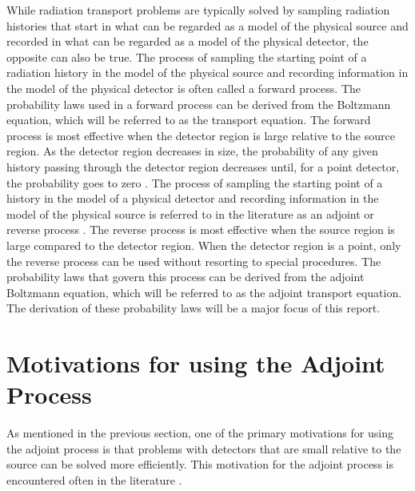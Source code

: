 While radiation transport problems are typically solved by sampling radiation
histories that start in what can be regarded as a model of the physical source
and recorded in what can be regarded as a model of the physical detector, the
opposite can also be true. The process of sampling the starting point of a 
radiation history in the model of the physical source and recording information
in the model of the physical detector is often called a forward process. The 
probability laws used in a forward process can be derived from the Boltzmann 
equation, which will be referred to as the transport equation. The forward 
process is most effective when the detector region is large relative to the 
source region. As the detector region decreases in size, the probability of any 
given history passing through the detector region decreases until, for a point 
detector, the probability goes to zero \citep{spanier_monte_1969}. The process 
of sampling the starting point of a history in the model of a physical detector 
and recording information in the model of the physical source is referred to in 
the literature as an adjoint or reverse process 
\citep{spanier_monte_1969, desorgher_implementation_2010}. The reverse process 
is most effective when the source region is large compared to the detector 
region. When the detector region is a point, only the reverse process can be 
used without resorting to special procedures. The probability laws that govern 
this process can be derived from the adjoint Boltzmann equation, which will be
referred to as the adjoint transport equation. The derivation of these 
probability laws will be a major focus of this report.

\section{Motivations for using the Adjoint Process}
As mentioned in the previous section, one of the primary motivations for using
the adjoint process is that problems with detectors that are small relative to
the source can be solved more efficiently. This motivation for the adjoint
process is encountered often in the literature 
\citep{spanier_monte_1969, bell_nuclear_1979, lewis_computational_1993}. 


